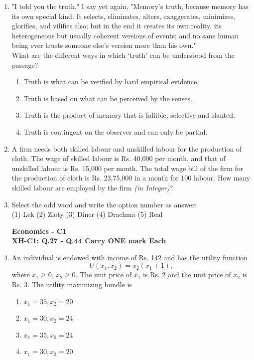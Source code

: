 \documentclass[journal,13pt,onecolumn]{exam}
\theoremstyle{remark}
\begin{document}
\begin{enumerate}[label=Q.\arabic*]
 \item "I told you the truth," I say yet again, "Memory's truth, because memory has its own special kind. It selects, eliminates, alters, exaggerates, minimizes, glorifies, and vilifies also; but in the end it creates its own reality, its heterogeneous but usually coherent versions of events; and no sane human being ever trusts someone else's version more than his own."\\
    What are the different ways in which `truth' can be understood from the passage?
    \begin{enumerate}
        \item Truth is what can be verified by hard empirical evidence.
        \item Truth is based on what can be perceived by the senses.
        \item Truth is the product of memory that is fallible, selective and slanted.
        \item Truth is contingent on the observer and can only be partial.
    \end{enumerate}

    \item A firm needs both skilled labour and unskilled labour for the production of cloth. The wage of skilled labour is Rs. 40,000 per month, and that of unskilled labour is Rs. 15,000 per month. The total wage bill of the firm for the production of cloth is Rs. 23,75,000 in a month for 100 labour. How many skilled labour are employed by the firm \textit{(in Integer)}?

    \item Select the odd word and write the option number as answer: \\
    (1) Lek \quad (2) Zloty \quad (3) Diner \quad (4) Drachma \quad (5) Real\\
    

 \vspace{1em}

 \textbf{Economics - C1}\\

 \textbf{XH-C1: Q.27 - Q.44 Carry ONE mark Each}\\

\item An individual is endowed with income of Rs. 142 and has the utility function 
    \[
    U(x_1, x_2) = x_2 (x_1 + 1),
    \]
    where \(x_1 \geq 0\), \(x_2 \geq 0\). The unit price of \(x_1\) is Rs. 2 and the unit price of \(x_2\) is Rs. 3. The utility maximizing bundle is
    \begin{enumerate}
        \item \(x_1 = 35, x_2 = 20\)
        \item \(x_1 = 30, x_2 = 24\)
        \item \(x_1 = 35, x_2 = 24\)
        \item \(x_1 = 30, x_2 = 20\)
    \end{enumerate}


\end{enumerate}
\end{document}
